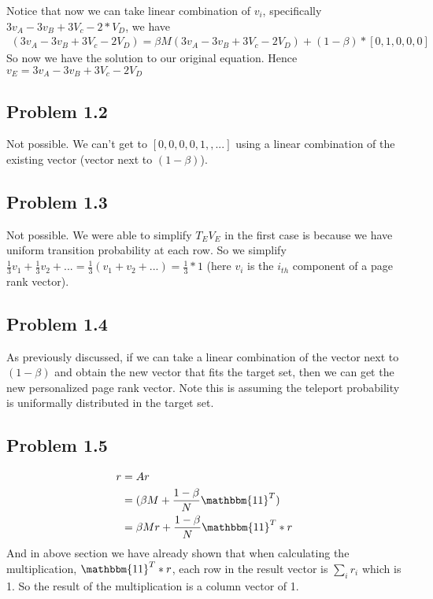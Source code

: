 \documentclass{book}
\begin{document}
Notice that now we can take linear combination of $v_i$, specifically $3v_A - 3v_B + 3V_c - 2 * V_D$, we have 
    \begin{align*}
        (3v_A - 3v_B + 3V_c - 2 V_D) = \beta M (3v_A - 3v_B + 3V_c - 2 V_D) + (1-\beta) * [0, 1, 0, 0, 0]
    \end{align*}
So now we have the solution to our original equation. Hence $v_E = 3v_A - 3v_B + 3V_c - 2 V_D$


\subsection*{Problem 1.2}
Not possible. We can't get to $[0,0,0,0,1,,...]$ using a linear combination of the existing vector (vector next to $(1-\beta)$). 

\subsection*{Problem 1.3}
Not possible. We were able to simplify $T_E V_E$ in the first case is because we have uniform transition probability at each row. So we simplify $\frac{1}{3} v_1 + \frac{1}{3}v_2 + ... = \frac{1}{3}(v_1 + v_2 + ...) = \frac{1}{3} * 1$ (here $v_i$ is the $i_{th}$ component of a page rank vector). 


\subsection*{Problem 1.4}
As previously discussed, if we can take a linear combination of the vector next to $(1-\beta)$ and obtain the new vector that fits the target set, then we can get the new personalized page rank vector. Note this is assuming the teleport probability is uniformally distributed in the target set. 

\subsection*{Problem 1.5}
    \begin{align*}
        r 
        & = Ar\\
        & = (\beta M + \frac{1-\beta}{N}\mathbbm{11}^T)\\
        &= \beta M r + \frac{1-\beta}{N}\mathbbm{11}^T * r 
    \end{align*}
And in above section we have already shown that when calculating the multiplication,  $\mathbbm{11}^T * r $, each row in the result vector is $\sum_i r_i$ which is 1. So the result of the multiplication is a column vector of 1. 
\end{document}
